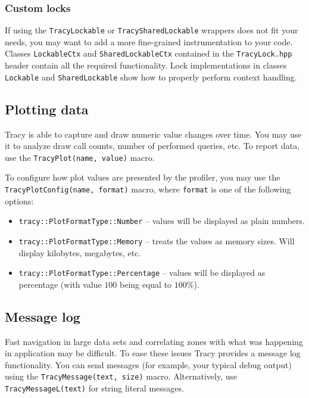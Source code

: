 \documentclass[hidelinks,titlepage,a4paper]{article}
\begin{document}
\subsubsection{Custom locks}

If using the \texttt{TracyLockable} or \texttt{TracySharedLockable} wrappers does not fit your needs, you may want to add a more fine-grained instrumentation to your code. Classes \texttt{LockableCtx} and \texttt{SharedLockableCtx} contained in the \texttt{TracyLock.hpp} header contain all the required functionality. Lock implementations in classes \texttt{Lockable} and \texttt{SharedLockable} show how to properly perform context handling.

\subsection{Plotting data}
\label{plottingdata}

Tracy is able to capture and draw numeric value changes over time. You may use it to analyze draw call counts, number of performed queries, etc. To report data, use the \texttt{TracyPlot(name, value)} macro.

To configure how plot values are presented by the profiler, you may use the \texttt{TracyPlotConfig(name, format)} macro, where \texttt{format} is one of the following options:

\begin{itemize}
\item \texttt{tracy::PlotFormatType::Number} -- values will be displayed as plain numbers.
\item \texttt{tracy::PlotFormatType::Memory} -- treats the values as memory sizes. Will display kilobytes, megabytes, etc.
\item \texttt{tracy::PlotFormatType::Percentage} -- values will be displayed as percentage (with value $100$ being equal to $100\%$).
\end{itemize}

\subsection{Message log}
\label{messagelog}

Fast navigation in large data sets and correlating zones with what was happening in application may be difficult. To ease these issues Tracy provides a message log functionality. You can send messages (for example, your typical debug output) using the \texttt{TracyMessage(text, size)} macro. Alternatively, use \texttt{TracyMessageL(text)} for string literal messages.
\end{document}
